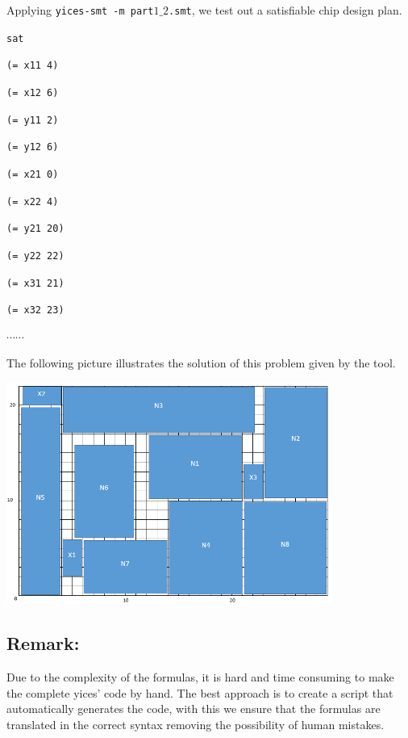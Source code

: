Applying {\tt yices-smt -m part$1\_2$.smt}, we test out a satisfiable chip design plan.

{\footnotesize

{\tt sat}

{\tt(= x11 4)}

{\tt(= x12 6)}

{\tt(= y11 2)}

{\tt(= y12 6)}

{\tt(= x21 0)}

{\tt(= x22 4)}

{\tt(= y21 20)}

{\tt(= y22 22)}

{\tt(= x31 21)}

{\tt(= x32 23)}

$\cdots \cdots$

}

The following picture illustrates the solution of this problem given by the tool.

\begin{center}
\includegraphics[width=0.8\textwidth]{Part1_2_3.png}
\end{center}

\subsection*{Remark:}
Due to the complexity of the formulas, it is hard and time consuming to make the complete yices' code by hand. The best approach is to create a script that automatically generates the code, with this we ensure that the formulas are translated in the correct syntax removing the possibility of human mistakes.

